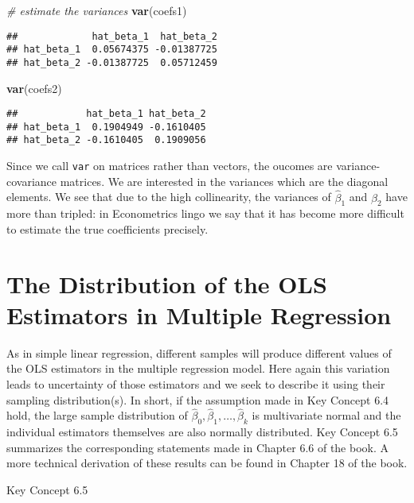 \documentclass[]{book}
\newenvironment{Shaded}{\begin{snugshade}}{\end{snugshade}}
\newcommand{\KeywordTok}[1]{\textcolor[rgb]{0.13,0.29,0.53}{\textbf{#1}}}
\newcommand{\CommentTok}[1]{\textcolor[rgb]{0.56,0.35,0.01}{\textit{#1}}}
\newcommand{\NormalTok}[1]{#1}
\theoremstyle{definition}
\theoremstyle{definition}
\theoremstyle{definition}
\theoremstyle{remark}
\begin{document}
\begin{Shaded}
\begin{Highlighting}[]
\CommentTok{# estimate the variances}
\KeywordTok{var}\NormalTok{(coefs1)}
\end{Highlighting}
\end{Shaded}

\begin{verbatim}
##             hat_beta_1  hat_beta_2
## hat_beta_1  0.05674375 -0.01387725
## hat_beta_2 -0.01387725  0.05712459
\end{verbatim}

\begin{Shaded}
\begin{Highlighting}[]
\KeywordTok{var}\NormalTok{(coefs2)}
\end{Highlighting}
\end{Shaded}

\begin{verbatim}
##            hat_beta_1 hat_beta_2
## hat_beta_1  0.1904949 -0.1610405
## hat_beta_2 -0.1610405  0.1909056
\end{verbatim}

Since we call \texttt{var} on matrices rather than vectors, the oucomes
are variance-covariance matrices. We are interested in the variances
which are the diagonal elements. We see that due to the high
collinearity, the variances of \(\hat\beta_1\) and \(\hat\beta_2\) have
more than tripled: in Econometrics lingo we say that it has become more
difficult to estimate the true coefficients precisely.

\section{The Distribution of the OLS Estimators in Multiple
Regression}\label{the-distribution-of-the-ols-estimators-in-multiple-regression}

As in simple linear regression, different samples will produce different
values of the OLS estimators in the multiple regression model. Here
again this variation leads to uncertainty of those estimators and we
seek to describe it using their sampling distribution(s). In short, if
the assumption made in Key Concept 6.4 hold, the large sample
distribution of \(\hat\beta_0,\hat\beta_1,\dots,\hat\beta_k\) is
multivariate normal and the individual estimators themselves are also
normally distributed. Key Concept 6.5 summarizes the corresponding
statements made in Chapter 6.6 of the book. A more technical derivation
of these results can be found in Chapter 18 of the book.

Key Concept 6.5
\end{document}

